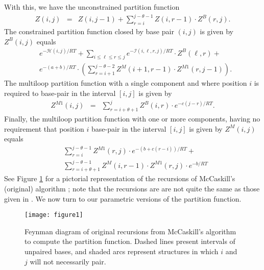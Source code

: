 With this, we have the unconstrained partition function
\begin{eqnarray}
Z(i,j) &= &Z(i,j-1) + \sum_{r=i}^{j-\theta-1} Z(i,r-1) \cdot Z^B(r,j).
\end{eqnarray}
The constrained partition function closed by base pair $(i,j)$ is
given by
$Z^B(i,j)$ equals
\begin{eqnarray}
&e^{-\mathcal{H}(i,j)/RT} +
\displaystyle\sum_{i \leq \ell \leq r \leq j}
e^{-\mathcal{I}(i,\ell,r,j)/RT}\cdot Z^B(\ell,r) +\\
& e^{-(a+b)/RT} \cdot \left( \sum_{r=i+1}^{j-\theta-2} Z^M(i+1,r-1)
\cdot Z^{M1}(r,j-1) \right). \nonumber
\end{eqnarray}
The multiloop partition function with a single component and where
position $i$ is required to base-pair in the interval $[i,j]$ is given
by
\begin{eqnarray}
Z^{M1}(i,j) &= &
\displaystyle\sum_{r=i+\theta+1}^j Z^B(i,r) \cdot
e^{-c(j-r)/RT} .
\end{eqnarray}
Finally, the multiloop partition function with one or more components,
having no requirement that position $i$ base-pair in the interval $[i,j]$
is given by $Z^{M}(i,j)$ equals
\begin{eqnarray}
&
\displaystyle\sum_{r=i}^{j-\theta-1}  Z^{M1}(r,j) \cdot
e^{-(b+c(r-i))/RT}  + \\
&\displaystyle\sum_{r=i+\theta+1}^{j-\theta-1}  Z^{M}(i,r-1) \cdot
Z^{M1}(r,j) \cdot e^{-b/RT}  \nonumber
\end{eqnarray}
See Figure \ref{fig:feynmanDiagram} for a pictorial representation
of the recursions of McCaskill's (original) algorithm \citep{mcCaskill};
note that the recursions are are not quite the same
as those given in \citep{hofacker:FastFolding}.
We now turn to our parametric versions of the partition function.

\begin{figure}[htp]
\centerline{\texttt{[image: figure1]}}
\caption{Feynman diagram of original recursions from McCaskill's
algorithm \citep{mcCaskill} to compute the partition function.
Dashed lines present intervals of unpaired bases, and shaded
arcs represent structures in which $i$ and $j$ will not necessarily pair.
}
\label{fig:feynmanDiagram}
\end{figure}


